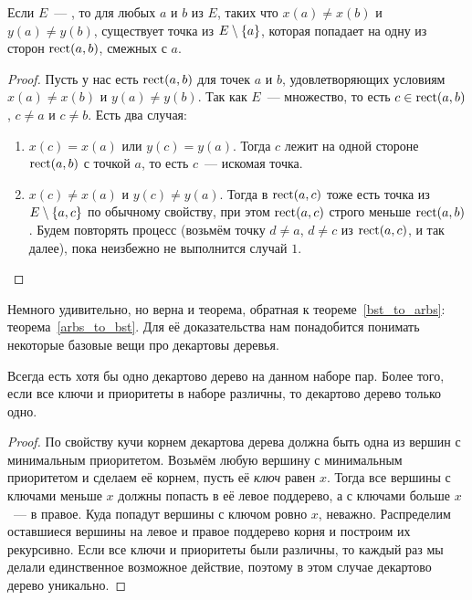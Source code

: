 \begin{lemma}\label{strong_arbs} Если $E$~--- \arbs, то для любых $a$ и $b$ из $E$, таких что $x(a) \neq x(b)$ и $y(a) \neq y(b)$, существует точка из $E \setminus \lbrace a\rbrace$, которая попадает на одну из сторон $\operatorname{rect}(a, b)$, смежных с $a$.
\end{lemma}
\begin{proof} Пусть у нас есть $\operatorname{rect}(a, b)$ для точек $a$ и $b$, удовлетворяющих
	условиям $x(a) \neq x(b)$ и $y(a) \neq y(b)$. Так как $E$~--- \arbs множество, то есть
	$c \in \operatorname{rect}(a, b)$, $c \neq a$ и $c \neq b$. Есть два случая:
	\begin{enumerate}
		\item $x(c) = x(a)$ или $y(c) = y(a)$. Тогда $c$ лежит на одной стороне $\operatorname{rect}(a, b)$
		      с точкой $a$, то есть $c$~--- искомая точка.
		\item $x(c) \neq x(a)$ и $y(c) \neq y(a)$. Тогда в $\operatorname{rect}(a, c)$ тоже есть точка из $E \setminus \lbrace a, c\rbrace$ по обычному \arbs свойству, при этом $\operatorname{rect}(a, c)$ строго меньше
		      $\operatorname{rect}(a, b)$. Будем повторять процесс (возьмём точку $d \neq a$, $d \neq c$ из $\operatorname{rect}(a, c)$,
		      и так далее), пока неизбежно не выполнится случай $1$.
	\end{enumerate}
\end{proof}

Немного удивительно, но верна и теорема, обратная к теореме~\ref{bst_to_arbs}:
теорема~\ref{arbs_to_bst}. Для её доказательства нам понадобится понимать
некоторые базовые вещи про декартовы деревья.



\begin{lemma} Всегда есть хотя бы одно декартово дерево на данном наборе пар.
	Более того, если все ключи и приоритеты в наборе различны, то
	декартово дерево только одно.
\end{lemma}
\begin{proof} По свойству кучи корнем декартова дерева должна быть одна из вершин с минимальным приоритетом. Возьмём любую вершину с минимальным приоритетом и сделаем её корнем, пусть её \emph{ключ} равен $x$. Тогда все вершины с ключами меньше $x$ должны попасть в её левое поддерево, а с ключами больше $x$~--- в правое. Куда попадут вершины с ключом ровно $x$, неважно. Распределим оставшиеся вершины на левое и правое поддерево корня и построим их рекурсивно. Если все ключи и приоритеты были различны, то каждый раз мы делали единственное возможное действие, поэтому в этом случае декартово дерево уникально.
\end{proof}

